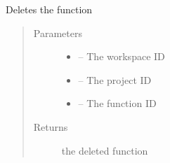 \documentclass[letterpaper,10pt,english]{sphinxmanual}
\begin{document}
\begin{fulllineitems}
\label{_source/son_editor.impl:son_editor.impl.functionsimpl.delete_function}
Deletes the function
\begin{quote}\begin{description}
\item[{Parameters}] \leavevmode\begin{itemize}
\item {} 
 -- The workspace ID

\item {} 
 -- The project ID

\item {} 
 -- The function ID

\end{itemize}

\item[{Returns}] \leavevmode
the deleted function

\end{description}\end{quote}

\end{fulllineitems}

\end{document}
